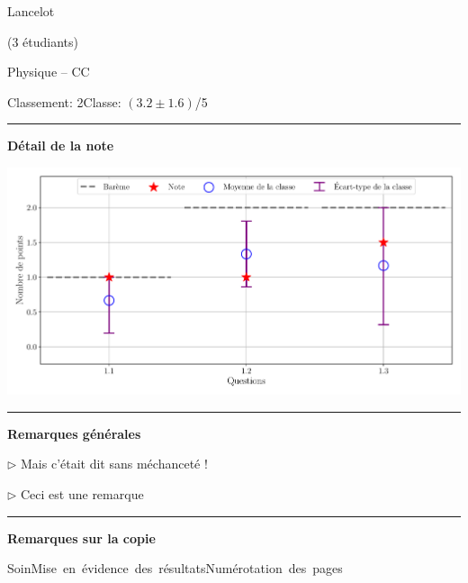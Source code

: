 \documentclass[12pt, a4paper]{article}
\begin{document}
\noindent\begin{minipage}[c]{0.31\linewidth}\noindent Lancelot\end{minipage}\hfill
\begin{minipage}[c]{0.31\linewidth}\hfill(3 étudiants)\end{minipage}
\begin{center} Physique -- CC\bigskip

{\Large\bf {}}\end{center}

\vspace*{-0.7cm}\noindent Classement: 2\hfill Classe:  $\left(3.2 \pm 1.6\right)$/5
\noindent\rule{\linewidth}{.7pt}\begin{center}{\large\bf Détail de la note}\end{center}

\begin{center}
\includegraphics[keepaspectratio, width=\linewidth]{./output/DU LAC_Lancelot_GradeStats.pdf}\end{center}


\noindent\rule{\linewidth}{.7pt}\begin{center}{\large\bf Remarques générales}\end{center}

$\triangleright$\xspace Mais c’était dit sans méchanceté !

$\triangleright$\xspace Ceci est une remarque


\noindent\rule{\linewidth}{.7pt}\begin{center}{\large\bf Remarques sur la copie}\end{center}

\begin{center}
\noindent \mbox{Soin\xspace\xspace\color{DarkOrange}\faMehO\color{black}}\hfill \mbox{Mise en évidence des résultats\xspace\xspace\color{DarkGreen}\faSmileO\color{black}}\hfill \mbox{Numérotation des pages\xspace\xspace\color{DarkRed}\faFrownO\color{black}}\hfill 
\end{center}
\end{document}
